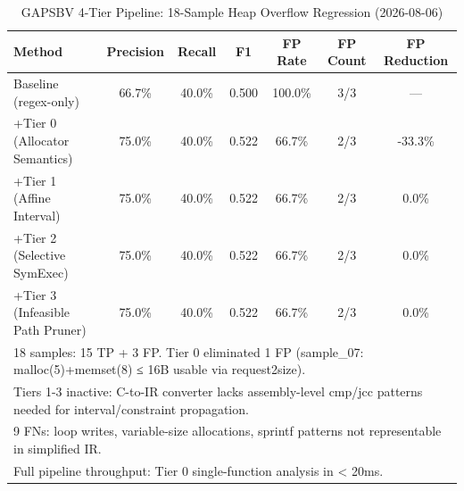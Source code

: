 \begin{table}[htbp]
\centering
\caption{GAPSBV 4-Tier Pipeline: 18-Sample Heap Overflow Regression (2026-08-06)}
\label{tab:gapsbv-regression}
\begin{tabular}{lcccccc}
\toprule
\textbf{Method} & \textbf{Precision} & \textbf{Recall} & \textbf{F1} & \textbf{FP Rate} & \textbf{FP Count} & \textbf{FP Reduction} \\
\midrule
Baseline (regex-only) & 66.7\% & 40.0\% & 0.500 & 100.0\% & 3/3 & --- \\
+Tier 0 (Allocator Semantics) & 75.0\% & 40.0\% & 0.522 & 66.7\% & 2/3 & -33.3\% \\
+Tier 1 (Affine Interval) & 75.0\% & 40.0\% & 0.522 & 66.7\% & 2/3 & 0.0\% \\
+Tier 2 (Selective SymExec) & 75.0\% & 40.0\% & 0.522 & 66.7\% & 2/3 & 0.0\% \\
+Tier 3 (Infeasible Path Pruner) & 75.0\% & 40.0\% & 0.522 & 66.7\% & 2/3 & 0.0\% \\
\midrule
\multicolumn{7}{l}{\footnotesize 18 samples: 15 TP + 3 FP. Tier 0 eliminated 1 FP (sample\_07: malloc(5)+memset(8) ≤ 16B usable via request2size).} \\
\multicolumn{7}{l}{\footnotesize Tiers 1-3 inactive: C-to-IR converter lacks assembly-level cmp/jcc patterns needed for interval/constraint propagation.} \\
\multicolumn{7}{l}{\footnotesize 9 FNs: loop writes, variable-size allocations, sprintf patterns not representable in simplified IR.} \\
\multicolumn{7}{l}{\footnotesize Full pipeline throughput: Tier 0 single-function analysis in < 20ms.} \\
\bottomrule
\end{tabular}
\end{table}

